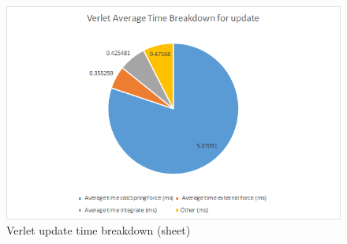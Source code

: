     \begin{figure}
    \begin{center}
      \includegraphics[scale=.9]{Figures/sheet_v_ut}
    \end{center}
    \caption{Verlet update time breakdown (sheet)}
    \label{fig:v ut sheet}
  \end{figure}

